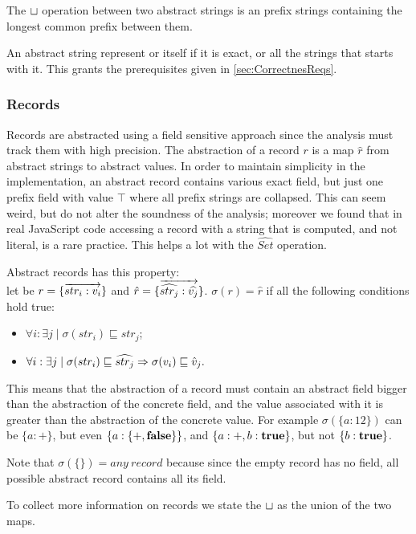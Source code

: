 The $\sqcup$ operation between two abstract strings is an prefix strings containing the longest common prefix between them.

An abstract string represent or itself if it is exact, or all the strings that starts with it. This grants the prerequisites given in \ref{sec:CorrectnesReqs}.

\subsubsection{Records}
Records are abstracted using a field sensitive approach since the analysis must track them with high precision. The abstraction of a record $r$ is a map $\hat{r}$ from abstract strings to abstract values. In order to maintain simplicity in the implementation, an abstract record contains various exact field, but just one prefix field with value $\top$ where all prefix strings are collapsed. This can seem weird, but do not alter the soundness of the analysis; moreover we found that in real JavaScript code accessing a record with a string that is computed, and not literal, is a rare practice. This helps a lot with the $\widehat{Set}$ operation.

Abstract records has this property: \\
let be $r = \{\overrightarrow{str_i: v_i}\}$ and $\hat{r}=\{\overrightarrow{\widehat{str_j}: \widehat{v_j}}\}$. $\sigma(r) = \hat{r}$ if all the following conditions hold true: 
\begin{itemize}
\item $\forall i: \exists j \mid \sigma(str_i) \sqsubseteq str_j$;
\item $\forall i: \exists j \mid \sigma(str_i) \sqsubseteq \widehat{str_j} \Rightarrow \sigma(v_i) \sqsubseteq \hat{v}_j.$
\end{itemize}

This means that the abstraction of a record must contain an abstract field bigger than the abstraction of the concrete field, and the value associated with it is greater than the abstraction of the concrete value. For example $\sigma(\{a: 12\})$ can be $\{a: +\}$, but even $\{a: \{+, \mathbf{false}\}\}$, and $\{a: +, b: \mathbf{true}\}$, but not $\{b: \mathbf{true}\}$. 

Note that $\sigma(\{\}) = any\ record$ because since the empty record has no field, all possible abstract record contains all its field.

To collect more information on records we state the $\sqcup$ as the union of the two maps.

